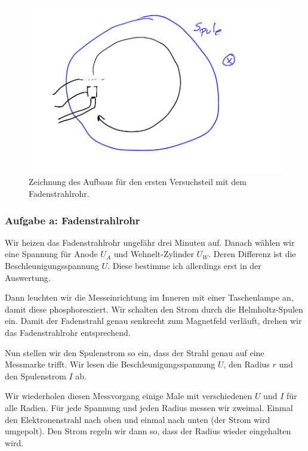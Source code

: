 \documentclass[11pt, ngerman]{article}
\begin{document}
\begin{figure}[h!]
	\centering
	\includegraphics[width=\textwidth]{Aufbau_Fadenstrahlrohr.pdf}
	\caption{Zeichnung des Aufbaus für den ersten Versuchsteil mit dem Fadenstrahlrohr.}
	\label{fig:Fadenstrahlrohr}
\end{figure}

\subsubsection{Aufgabe a: Fadenstrahlrohr}

\label{Durchführung-a}

Wir heizen das Fadenstrahlrohr ungefähr drei Minuten auf. Danach wählen wir
eine Spannung für Anode $U_A$ und Wehnelt-Zylinder $U_W$. Deren Differenz ist
die Beschleunigungsspannung $U$. Diese bestimme ich allerdings erst in der
Auswertung.

Dann leuchten wir die Messeinrichtung im Inneren mit einer Taschenlampe an,
damit diese phosphoresziert. Wir schalten den Strom durch die Helmholtz-Spulen
ein. Damit der Fadenstrahl genau senkrecht zum Magnetfeld verläuft, drehen wir
das Fadenstrahlrohr entsprechend.

Nun stellen wir den Spulenstrom so ein, dass der Strahl genau auf eine
Messmarke trifft. Wir lesen die Beschleunigungsspannung $U$, den Radius $r$ und
den Spulenstrom $I$ ab.

Wir wiederholen diesen Messvorgang einige Male mit verschiedenen $U$ und $I$
für alle Radien. Für jede Spannung und jeden Radius messen wir zweimal. Einmal
den Elektronenstrahl nach oben und einmal nach unten (der Strom wird umgepolt).
Den Strom regeln wir dann so, dass der Radius wieder eingehalten wird.
\end{document}
